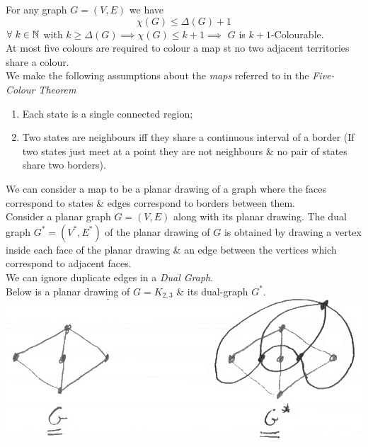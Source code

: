 \documentclass[11pt,a4paper]{article}
\begin{document}
For any graph $G=(V,E)$ we have
$$\chi(G)\leq\Delta(G)+1$$
\NB $\forall\ k\in\mathbb{N}$ with $k\geq\Delta(G)\implies\chi(G)\leq k+1\implies$ $G$ is $k+1$-Colourable.\\

At most five colours are required to colour a map st no two adjacent territories share a colour.\\

We make the following assumptions about the \textit{maps} referred to in the \textit{Five-Colour Theorem}
\begin{enumerate}
	\item Each state is a single connected region;
	\item Two states are neighbours iff they share a continuous interval of a border (\ie If two states just meet at a point they are not neighbours \& no pair of states share two borders).
\end{enumerate}

We can consider a map to be a planar drawing of a graph where the faces correspond to states \& edges correspond to borders between them.\\

Consider a planar graph $G=(V,E)$ along with its planar drawing. The dual graph $G^*=(V^*,E^*)$ of the planar drawing of $G$ is obtained by drawing a vertex inside each face of the planar drawing \& an edge between the vertices which correspond to adjacent faces.\\
\NB We can ignore duplicate edges in a \textit{Dual Graph}.\\

Below is a planar drawing of $G=K_{2,3}$ \& its dual-graph $G^*$.\\
\includegraphics[scale=0.3]{img/dual.png}
\end{document}
